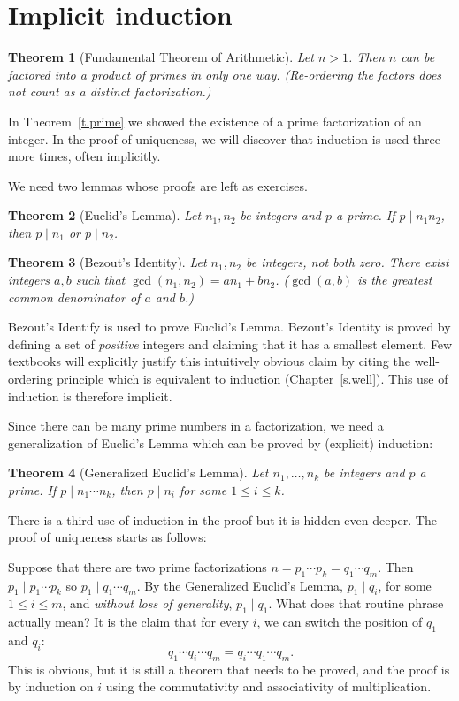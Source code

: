 \documentclass[11pt,a4paper]{report}
\newtheorem{theorem}{Theorem}
\begin{document}
\section{Implicit induction}\label{s.unique}

\begin{theorem}[Fundamental Theorem of Arithmetic]
Let $n>1$. Then $n$ can be factored into a product of primes in only one way. (Re-ordering the factors does not count as a distinct factorization.)
\end{theorem}

In Theorem~\ref{t.prime} we showed the existence of a prime factorization of an integer. In the proof of uniqueness, we will discover that induction is used three more times, often implicitly.

We need two lemmas whose proofs are left as exercises.

\begin{theorem}[Euclid's Lemma]
Let $n_1,n_2$ be integers and $p$ a prime. If $p \mid n_1 n_2$, then $p\mid n_1$ or $p\mid n_2$.
\end{theorem}

\begin{theorem}[Bezout's Identity]
Let $n_1, n_2$ be integers, not both zero. There exist integers $a,b$ such that $\gcd(n_1,n_2)=an_1+bn_2$. ($\gcd(a,b)$ is the greatest common denominator of $a$ and $b$.)
\end{theorem}

Bezout's Identify is used to prove Euclid's Lemma. Bezout's Identity is proved by defining a set of \emph{positive} integers and claiming that it has a smallest element. Few textbooks will explicitly justify this intuitively obvious claim by citing the well-ordering principle which is equivalent to induction (Chapter~\ref{s.well}). This use of induction is therefore implicit.

Since there can be many prime numbers in a factorization, we need a generalization of Euclid's Lemma which can be proved by (explicit) induction:

\begin{theorem}[Generalized Euclid's Lemma]
Let $n_1,\ldots,n_k$ be integers and $p$ a prime. If $p \mid n_1 \cdots n_k$, then $p\mid n_i$ for some $1\leq i \leq k$.
\end{theorem}

There is a third use of induction in the proof but it is hidden even deeper. The proof of uniqueness starts as follows:

Suppose that there are two prime factorizations $n=p_1 \cdots p_k = q_1 \cdots q_m$. Then $p_1\mid p_1 \cdots p_k$ so $p_1 \mid q_1 \cdots q_m$. By the Generalized Euclid's Lemma, $p_1 \mid q_i$, for some $1\leq i \leq m$, and \emph{without loss of generality}, $p_1 \mid q_1$. What does that routine phrase actually mean? It is the claim that for every $i$, we can switch the position of $q_1$ and $q_i$:
\[
q_1 \cdots q_i \cdots q_m = q_i \cdots q_1 \cdots q_m.
\]
This is obvious, but it is still a theorem that needs to be proved, and the proof is by induction on $i$ using the commutativity and associativity of multiplication.
\end{document}

